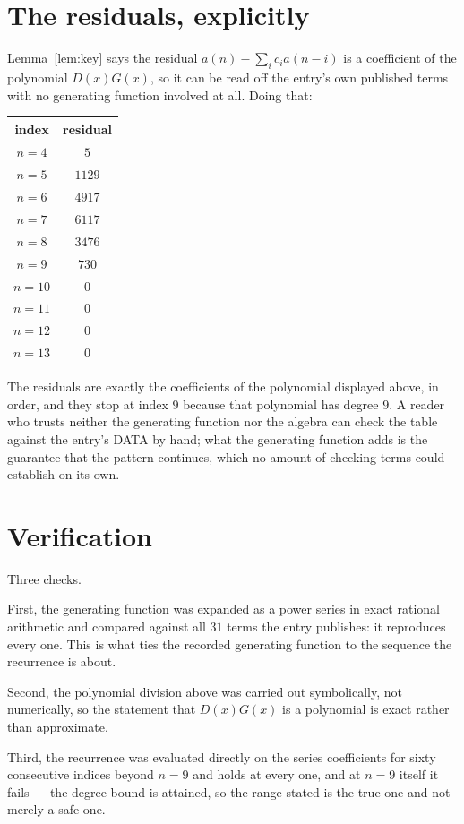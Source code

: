 \documentclass[11pt,a4paper]{article}
\theoremstyle{plain}
\theoremstyle{definition}
\begin{document}
\section{The residuals, explicitly}

Lemma~\ref{lem:key} says the residual $a(n)-\sum_ic_ia(n-i)$ is a coefficient of the
polynomial $D(x)G(x)$, so it can be read off the entry's own published terms with no
generating function involved at all. Doing that:
\begin{center}
\begin{tabular}{cc}
index & residual \\ \hline
$n=4$ & $5$ \\
$n=5$ & $1129$ \\
$n=6$ & $4917$ \\
$n=7$ & $6117$ \\
$n=8$ & $3476$ \\
$n=9$ & $730$ \\
$n=10$ & $0$ \\
$n=11$ & $0$ \\
$n=12$ & $0$ \\
$n=13$ & $0$
\end{tabular}
\end{center}
The residuals are exactly the coefficients of the polynomial displayed above, in order, and
they stop at index $9$ because that polynomial has degree $9$. A reader who trusts
neither the generating function nor the algebra can check the table against the entry's DATA
by hand; what the generating function adds is the guarantee that the pattern continues, which
no amount of checking terms could establish on its own.

\section{Verification}

Three checks.

First, the generating function was expanded as a power series in exact rational arithmetic and
compared against all $31$ terms the entry publishes: it reproduces every one. This is
what ties the recorded generating function to the sequence the recurrence is about.

Second, the polynomial division above was carried out symbolically, not numerically, so the
statement that $D(x)G(x)$ is a polynomial is exact rather than approximate.

Third, the recurrence was evaluated directly on the series coefficients for sixty consecutive
indices beyond $n=9$ and holds at every one, and at $n=9$ itself it fails --- the
degree bound is attained, so the range stated is the true one and not merely a safe one.
\end{document}
